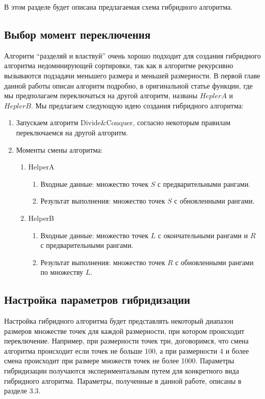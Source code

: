 В этом разделе будет описана предлагаемая схема гибридного алгоритма.

\subsection{Выбор момент переключения}

Алгоритм ``разделяй и властвуй'' очень хорошо подходит для создания гибридного алгоритма недоминирующей сортировки, так как в алгоритме рекурсивно вызываются подзадачи меньшего размера и меньшей размерности. В первой главе данной работы описан алгоритм подробно, в оригинальной статье функции, где мы предполагаем переключаться на другой алгоритм, названы $HeplerA$ и $HeplerB$. Мы предлагаем следующую идею создания гибридного алгоритма: 
\begin{enumerate}
  \item Запускаем алгоритм Divide\&Conquer, согласно некоторым правилам переключаемся на другой алгоритм.
  \item Моменты смены алгоритма:
    \begin{enumerate}
    \item HelperA
      \begin{enumerate}
      \item Входные данные: множество точек $S$ с предварительными рангами.
      \item Результат выполнения: множество точек $S$ с обновленными рангами.
      \end{enumerate}
    \item HelperB  
      \begin{enumerate}
      \item Входные данные: множество точек $L$ с окончательными рангами и $R$ с предварительными рангами.
      \item Результат выполнения: множество точек $R$ с обновленными рангами по множеству $L$.
      \end{enumerate}
    \end{enumerate}
\end{enumerate}

\subsection{Настройка параметров гибридизации}

Настройка гибридного алгоритма будет представлять некоторый диапазон размеров множестве точек для каждой размерности, при котором происходит переключение. Например, при размерности точек три, договоримся, что смена алгоритма происходит если точек не больше 100, а при размерности 4 и более смена происходит при размере множеств точек не более 1000. Параметры гибридизации получаются экспериментальным путем для конкретного вида гибридного алгоритма. Параметры, полученные в данной работе, описаны в разделе 3.3.

